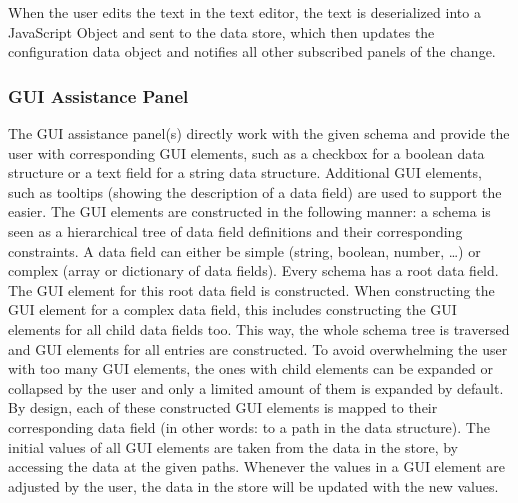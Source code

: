 When the user edits the text in the text editor, the text is deserialized into a JavaScript Object and sent to the data store, which then updates the configuration data object and notifies all other subscribed panels of the change.


\subsubsection{GUI Assistance Panel}
The GUI assistance panel(s) directly work with the given schema and provide the user with corresponding GUI elements, such as a checkbox for a boolean data structure or a text field for a string data structure.
Additional GUI elements, such as tooltips (showing the description of a data field) are used to support the easier.
The GUI elements are constructed in the following manner: a schema is seen as a hierarchical tree of data field definitions and their corresponding constraints.
A data field can either be simple (string, boolean, number, \ldots) or complex (array or dictionary of data fields).
Every schema has a root data field.
The GUI element for this root data field is constructed. %
When constructing the GUI element for a complex data field, this includes constructing the GUI elements for all child data fields too.
This way, the whole schema tree is traversed and GUI elements for all entries are constructed.
To avoid overwhelming the user with too many GUI elements, the ones with child elements can be expanded or collapsed by the user and only a limited amount of them is expanded by default.
By design, each of these constructed GUI elements is mapped to their corresponding data field (in other words: to a path in the data structure).
The initial values of all GUI elements are taken from the data in the store, by accessing the data at the given paths.
Whenever the values in a GUI element are adjusted by the user, the data in the store will be updated with the new values.

%

